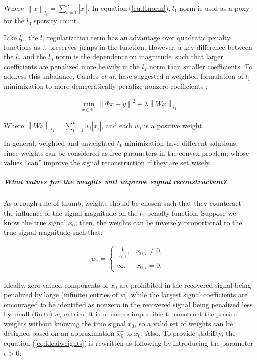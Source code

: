 Where $\left \| x \right \|_{l_{1}}=\sum_{i=1}^{n}\left | x_{_{i}} \right |$. In equation (\ref{eq:l1norm}), $l_{1}$ norm is used as a poxy for the $l_{0}$ sparsity count.

Like $l_{0}$, the $l_{1}$ regularization term has an advantage over quadratic penalty functions as it preserves jumps in the function. However, a key difference between the $l_{1}$ and the $l_{0}$ norm is the dependence on magnitude, such that larger coefficients are penalized more heavily in the $l_{1}$ norm than smaller coefficients. To address this imbalance, Candes \emph{et al.} have suggested a weighted formulation of $l_{1}$ minimization to more democratically penalize nonzero coefficients \cite{candes2008enhancing}:

\begin{equation}
\label{eq:weightedl1norm}
\begin{gathered}
\min_{x\in \mathbb{R}^{n}}\left\|\Phi x-y\right\|^{2} + \lambda \left \|Wx  \right \|_{l_{1}}
\end{gathered}
\end{equation}

Where $\left \| Wx \right \|_{l_{1}}=\sum_{i=1}^{n}w_{i}\left | x_{_{i}} \right |$, and each $w_{i}$ is a positive weight.

In general, weighted and unweighted $l_{1}$ minimization have different solutions, since weights can be considered as free parameters in the convex problem, whose values ``can'' improve the signal reconstruction if they are set wisely.

\subparagraph*{What values for the weights will improve signal reconstruction?}
As a rough rule of thumb, weights should be chosen such that they counteract the influence of the signal magnitude on the $l_{1}$ penalty function. Suppose we know the true signal $x_{0}$; then, the weights can be inversely proportional to the true signal magnitude such that:

\begin{equation}
\label{eq:idealweights}
\begin{gathered}
w_{i} = \left\{\begin{matrix}
\frac{1}{\left | x_{0,i} \right |} , & x_{0,i} \neq 0 , \\ 
\infty , &  x_{0,i} = 0.
\end{matrix}\right.
\end{gathered}
\end{equation}

Ideally, zero-valued components of $x_{0}$ are prohibited in the recovered signal being penalized by large (infinite) entries of $w_{i}$, while the largest signal coefficients are encouraged to be identified as nonzero in the recovered signal being penalized less by small (finite) $w_{i}$ entries. It is of course impossible to construct the precise weights without knowing the true signal $x_{0}$, so a valid set of weights can be designed based on an approximation $\hat{x_{0}}$ to $x_{0}$. Also, To provide stability, the equation (\ref{eq:idealweights}) is rewritten as following by introducing the parameter $\epsilon > 0$:


